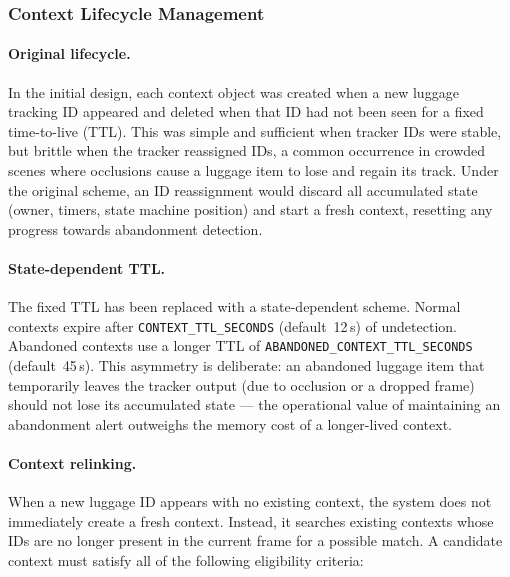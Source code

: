 \subsubsection{Context Lifecycle Management}
\label{sec:context_lifecycle}

\paragraph{Original lifecycle.}

In the initial design, each context object was created when a new luggage
tracking ID appeared and deleted when that ID had not been seen for a fixed
time-to-live (TTL). This was simple and sufficient when tracker IDs were
stable, but brittle when the tracker reassigned IDs, a common occurrence in
crowded scenes where occlusions cause a luggage item to lose and regain its
track. Under the original scheme, an ID reassignment would discard all
accumulated state (owner, timers, state machine position) and start a fresh
context, resetting any progress towards abandonment detection.

\paragraph{State-dependent TTL.}

The fixed TTL has been replaced with a state-dependent scheme. Normal contexts
expire after \texttt{CONTEXT\_TTL\_SECONDS} (default~12\,s) of undetection.
Abandoned contexts use a longer TTL of
\texttt{ABANDONED\_CONTEXT\_TTL\_SECONDS} (default~45\,s). This asymmetry is
deliberate: an abandoned luggage item that temporarily leaves the tracker
output (due to occlusion or a dropped frame) should not lose its accumulated
state --- the operational value of maintaining an abandonment alert outweighs
the memory cost of a longer-lived context.

\paragraph{Context relinking.}

When a new luggage ID appears with no existing context, the system does not
immediately create a fresh context. Instead, it searches existing contexts
whose IDs are no longer present in the current frame for a possible match. A
candidate context must satisfy all of the following eligibility criteria:

